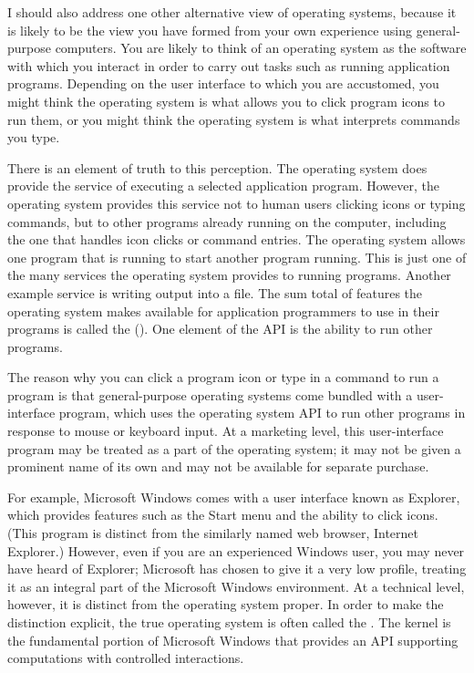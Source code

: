 I should also address one other alternative view of operating systems,
because it is likely to be the view you have formed from your own
experience using general-purpose computers.  You are likely to think
of an operating system as the software with which you interact in order to
carry out tasks such as running application programs.  Depending on
the user interface to which you are accustomed, you might think the
operating system is what allows you to click program icons to run
them, or you might think the operating system is what interprets
commands you type.

There is an element of truth to this perception.  The operating system
does provide the service of executing a selected application program.
However, the operating system provides this service not to human users
clicking icons or typing commands, but to other programs already
running on the computer, including the one that handles icon clicks or
command entries.  The operating system allows one program that is
running to start another program running.  This is just one of the
many services the operating system provides to running programs.
Another example service is
writing output into a file.  The sum total of features the
operating system makes available for application programmers to use in
their programs is called the 
().  One element of the API is the ability to run other programs.

The reason why you can click a program icon or type in a command to
run a program is that general-purpose operating systems come bundled
with a user-interface program, which uses the operating system API to
run other programs in response to mouse or keyboard input.  At a
marketing level, this user-interface program may be treated as a part of
the operating system; it may not be given a prominent name of its own
and may not be available for separate purchase.

For example, Microsoft Windows comes with a user interface known as
Explorer, which provides features such as the Start menu and the
ability to click icons.  (This program is distinct from the
similarly named web browser, Internet Explorer.)  However, even if you
are an experienced Windows user, you may never have heard of Explorer;
Microsoft has chosen to give it a very low profile, treating it as an
integral part of the Microsoft Windows environment.  At a technical
level, however, it is distinct from the operating system proper.  In
order to make the distinction explicit, the true operating system is
often called the .  The kernel is the fundamental
portion of Microsoft Windows that provides an API supporting
computations with controlled interactions.

